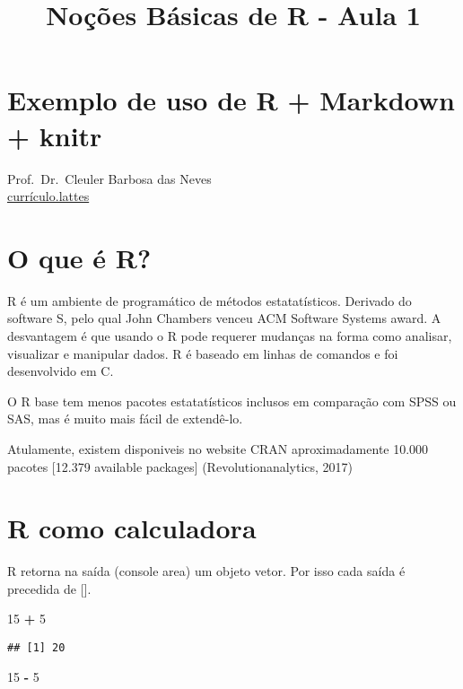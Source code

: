 \documentclass[]{article}
\title{Noções Básicas de R - Aula 1}
\author{}
\date{}
\newenvironment{Shaded}{\begin{snugshade}}{\end{snugshade}}
\newcommand{\DecValTok}[1]{\textcolor[rgb]{0.00,0.00,0.81}{#1}}
\newcommand{\StringTok}[1]{\textcolor[rgb]{0.31,0.60,0.02}{#1}}
\newcommand{\OperatorTok}[1]{\textcolor[rgb]{0.81,0.36,0.00}{\textbf{#1}}}
\begin{document}
\maketitle

\section{Exemplo de uso de R + Markdown +
knitr}\label{exemplo-de-uso-de-r-markdown-knitr}

Prof.~Dr.~Cleuler Barbosa das Neves\\
\href{http://buscatextual.cnpq.br/buscatextual/visualizacv.do?id=K4786159E2}{currículo.lattes}

\section{O que é R?}\label{o-que-e-r}

R é um ambiente de programático de métodos estatatísticos. Derivado do
software S, pelo qual John Chambers venceu ACM Software Systems award. A
desvantagem é que usando o R pode requerer mudanças na forma como
analisar, visualizar e manipular dados. R é baseado em linhas de
comandos e foi desenvolvido em C.

O R base tem menos pacotes estatatísticos inclusos em comparação com
SPSS ou SAS, mas é muito mais fácil de extendê-lo.

Atulamente, existem disponiveis no website CRAN aproximadamente 10.000
pacotes {[}12.379 available packages{]} (Revolutionanalytics, 2017)

\section{R como calculadora}\label{r-como-calculadora}

R retorna na saída (console area) um objeto vetor. Por isso cada saída é
precedida de {[}{]}.

\begin{Shaded}
\begin{Highlighting}[]
\DecValTok{15} \OperatorTok{+}\StringTok{ }\DecValTok{5} 
\end{Highlighting}
\end{Shaded}

\begin{verbatim}
## [1] 20
\end{verbatim}

\begin{Shaded}
\begin{Highlighting}[]
\DecValTok{15} \OperatorTok{-}\StringTok{ }\DecValTok{5}
\end{Highlighting}
\end{Shaded}
\end{document}
